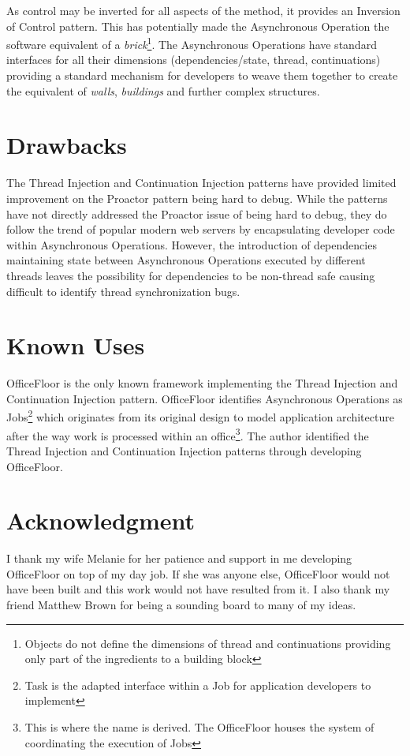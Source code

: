 \documentclass[prodmode]{style/acmlarge}
\begin{document}
As control may be inverted for all aspects of the method, it provides an
Inversion of Control pattern.  This has potentially made the Asynchronous
Operation the software equivalent of a \textit{brick}\footnote{Objects do not
define the dimensions of thread and continuations providing only part of the
ingredients to a building block}.  The Asynchronous Operations have standard
interfaces for all their dimensions (dependencies/state, thread, continuations)
providing a standard mechanism for developers to weave them together to create
the equivalent of \textit{walls}, \textit{buildings} and further complex
structures.


\section{Drawbacks}

The Thread Injection and Continuation Injection patterns have provided limited
improvement on the Proactor pattern being hard to debug.  While the patterns
have not directly addressed the Proactor issue of being hard to debug, they do
follow the trend of popular modern web servers by encapsulating developer code
within Asynchronous Operations.  However, the introduction of dependencies
maintaining state between Asynchronous Operations executed by different threads
leaves the possibility for dependencies to be non-thread safe causing difficult
to identify thread synchronization bugs.


\section{Known Uses}

OfficeFloor \cite{officefloor} is the only known framework implementing the
Thread Injection and Continuation Injection pattern.  OfficeFloor identifies
Asynchronous Operations as Jobs\footnote{Task is the adapted interface within a
Job for application developers to implement} which originates from its original
design to model application architecture after the way work is processed within
an office\footnote{This is where the name is derived. The OfficeFloor houses the
system of coordinating the execution of Jobs}.  The author identified the Thread
Injection and Continuation Injection patterns through developing OfficeFloor.


\section*{Acknowledgment} I thank my wife Melanie for her patience and support
in me developing OfficeFloor on top of my day job.  If she was anyone else,
OfficeFloor would not have been built and this work would not have resulted from
it.  I also thank my friend Matthew Brown for being a sounding board to many of
my ideas.




\end{document}
